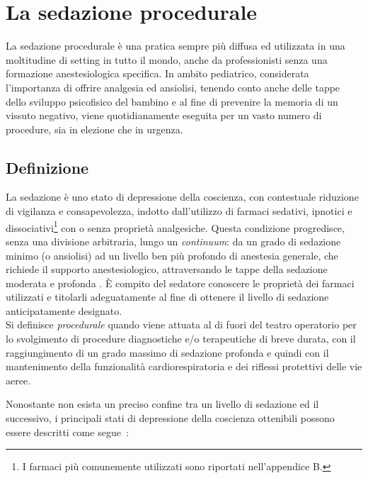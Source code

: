 \chapter{La sedazione procedurale}

La sedazione procedurale è una pratica sempre più diffusa ed utilizzata in una moltitudine di setting in tutto il mondo, anche da professionisti senza una formazione anestesiologica specifica. In ambito pediatrico, considerata l'importanza di offrire analgesia ed ansiolisi, tenendo conto anche delle tappe dello sviluppo psicofisico del bambino e al fine di prevenire la memoria di un vissuto negativo, viene quotidianamente eseguita per un vasto numero di procedure, sia in elezione che in urgenza. 

\section{Definizione}

La sedazione è uno stato di depressione della coscienza, con contestuale riduzione di vigilanza e consapevolezza, indotto dall'utilizzo di farmaci sedativi, ipnotici e dissociativi\footnote{I farmaci più comunemente utilizzati sono riportati nell'appendice B.} con o senza proprietà analgesiche. Questa condizione progredisce, senza una divisione arbitraria, lungo un \emph{continuum}: da un grado di sedazione minimo (o ansiolisi) ad un livello ben più profondo di anestesia generale, che richiede il supporto anestesiologico, attraversando le tappe della sedazione moderata e profonda \cite{Krauss2006}. \`E compito del sedatore conoscere le proprietà dei farmaci utilizzati e titolarli adeguatamente al fine di ottenere il livello di sedazione anticipatamente designato.  
\\Si definisce \emph{procedurale} quando viene attuata al di fuori del teatro operatorio per lo svolgimento di procedure diagnostiche e/o terapeutiche di breve durata, con il raggiungimento di un grado massimo di sedazione profonda e quindi con il mantenimento della funzionalità cardiorespiratoria e dei riflessi protettivi delle vie aeree. 

Nonostante non esista un preciso confine tra un livello di sedazione ed il successivo, i principali stati di depressione della coscienza ottenibili possono essere descritti come segue~\cite{Statpearls, Berkenbosch2015}:

